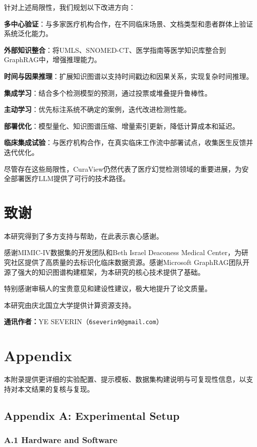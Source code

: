 \documentclass[11pt]{article}
\begin{document}
针对上述局限性，我们规划以下改进方向：

\textbf{多中心验证}：与多家医疗机构合作，在不同临床场景、文档类型和患者群体上验证系统泛化能力。

\textbf{外部知识整合}：将UMLS、SNOMED-CT、医学指南等医学知识库整合到GraphRAG中，增强推理能力。

\textbf{时间与因果推理}：扩展知识图谱以支持时间戳边和因果关系，实现复杂时间推理。

\textbf{集成学习}：结合多个检测模型的预测，通过投票或堆叠提升鲁棒性。

\textbf{主动学习}：优先标注系统不确定的案例，迭代改进检测性能。

\textbf{部署优化}：模型量化、知识图谱压缩、增量索引更新，降低计算成本和延迟。

\textbf{临床集成试验}：与医疗机构合作，在真实临床工作流中部署试点，收集医生反馈并迭代优化。

尽管存在这些局限性，CuraView仍然代表了医疗幻觉检测领域的重要进展，为安全部署医疗LLM提供了可行的技术路径。

\section{致谢}
本研究得到了多方支持与帮助，在此表示衷心感谢。

感谢MIMIC-IV数据集的开发团队和Beth Israel Deaconess Medical Center，为研究社区提供了高质量的去标识化临床数据资源。感谢Microsoft GraphRAG团队开源了强大的知识图谱构建框架，为本研究的核心技术提供了基础。

特别感谢审稿人的宝贵意见和建设性建议，极大地提升了论文质量。

本研究由庆北国立大学提供计算资源支持。

\textbf{通讯作者：}YE SEVERIN（\texttt{6severin9@gmail.com}）

\section{Appendix}
本附录提供更详细的实验配置、提示模板、数据集构建说明与可复现性信息，以支持对本文结果的复核与复现。

\subsection{Appendix A: Experimental Setup}

\subsubsection{A.1 Hardware and Software}
\end{document}
